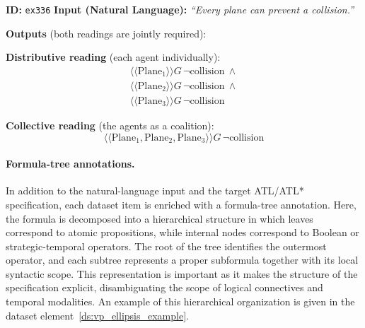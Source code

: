 \begin{dataset}[t]
\caption{Quantifier scope ambiguity (QSA) example with two jointly required readings}
\label{ds:qsa_example}
\begin{algorithmic}[1]
\STATE \textbf{ID:} \texttt{ex336}
\STATE \textbf{Input (Natural Language):}
\STATE \quad \textit{``Every plane can prevent a collision.''}

\STATE \textbf{Outputs} (both readings are jointly required):
\STATE \quad
\begin{minipage}[t]{0.92\linewidth}
\textbf{Distributive reading} (each agent individually):
\[
\begin{array}{l}
\langle\!\langle \text{Plane}_1 \rangle\!\rangle G\,\neg\text{collision} \ \wedge\\
\langle\!\langle \text{Plane}_2 \rangle\!\rangle G\,\neg\text{collision} \ \wedge\\
\langle\!\langle \text{Plane}_3 \rangle\!\rangle G\,\neg\text{collision}
\end{array}
\]
\end{minipage}

\STATE \quad
\begin{minipage}[t]{0.92\linewidth}
\textbf{Collective reading} (the agents as a coalition):
\[
\langle\!\langle \text{Plane}_1,\text{Plane}_2,\text{Plane}_3 \rangle\!\rangle G\,\neg\text{collision}
\]
\end{minipage}
\end{algorithmic}
\end{dataset}


\paragraph{Formula-tree annotations.}
In addition to the natural-language input and the target ATL/ATL* specification, each dataset item is enriched with a formula-tree annotation. Here, the formula is decomposed into a hierarchical structure in which leaves correspond to atomic propositions, while internal nodes correspond to Boolean or strategic-temporal operators. The root of the tree identifies the outermost operator, and each subtree represents a proper subformula together with its local syntactic scope. This representation is important as it makes the structure of the specification explicit, disambiguating the scope of logical connectives and temporal modalities. An example of this hierarchical organization is given in the dataset element~\ref{ds:vp_ellipsis_example}.

